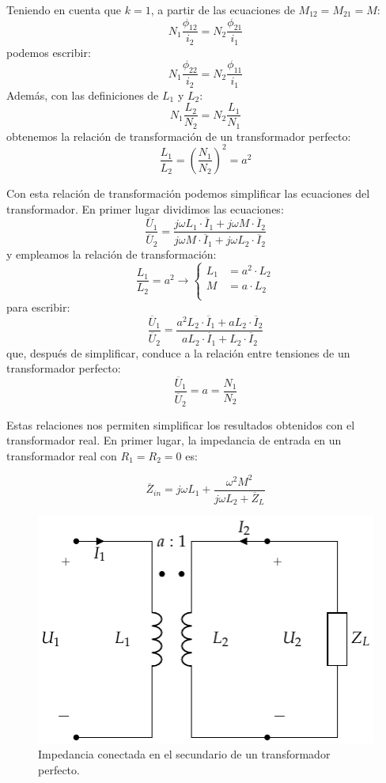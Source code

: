Teniendo en cuenta que $k = 1$, a partir de las ecuaciones de
$M_{12} = M_{21} = M$:
\[
  N_1 \frac{\phi_{12}}{i_2} = N_2 \frac{\phi_{21}}{i_1}
\]
podemos escribir:
\[
  N_1 \frac{\phi_{22}}{i_2} = N_2 \frac{\phi_{11}}{i_1}
\]
Además, con las definiciones de $L_1$ y $L_2$:
\[
  N_1 \frac{L_2}{N_2} = N_2 \frac{L_1}{N_1}
\]
obtenemos la relación de transformación de un transformador perfecto:
\begin{equation}
  \label{eq:trafo-perfecto-a}
  \boxed{\frac{L_1}{L_2} = \left(\frac{N_1}{N_2}\right)^2 = a^2}
\end{equation}


Con esta relación de transformación podemos simplificar las ecuaciones
del transformador. En primer lugar dividimos las ecuaciones:
\[
  \frac{\overline{U}_1}{\overline{U}_2} = \frac{j \omega L_1 \cdot
    \overline{I}_1 + j \omega M \cdot \overline{I}_2}{j \omega M \cdot
    \overline{I}_1 + j \omega L_2 \cdot \overline{I}_2}
\]
y empleamos la relación de transformación:
\[
  \frac{L_1}{L_2} = a^2 \rightarrow \left\{
    \begin{array}{ll}
      L_1 &= a^2 \cdot L_2\\
      M &= a \cdot L_2\\
    \end{array}\right.
\]
para escribir:
\[
  \frac{\overline{U}_1}{\overline{U}_2} = \frac{a^2 L_2 \cdot
    \overline{I}_1 + a L_2 \cdot \overline{I}_2}{a L_2 \cdot
    \overline{I}_1 + L_2 \cdot \overline{I}_2}
\]
que, después de simplificar, conduce a la relación entre tensiones de
un transformador perfecto:
\begin{equation}
  \label{eq:trafo-perfecto-tensiones}
  \boxed{\frac{\overline{U}_1}{\overline{U}_2} = a = \frac{N_1}{N_2}}
\end{equation}

Estas relaciones nos permiten simplificar los resultados obtenidos con
el transformador real. En primer lugar, la impedancia de entrada en un
transformador real con $R_1 = R_2 = 0$ es:

\[
  \overline{Z}_{in} = j\omega L_1 + \frac{\omega^2 M^2}{j\omega L_2 +
    \overline{Z}_L}
\]

\begin{figure}
  \centering
  \includegraphics[height=0.2\textheight]{../figs/TrafoPerfecto_ImpedanciaSecundario.pdf}
  \caption{Impedancia conectada en el secundario de un transformador perfecto.}
  \label{fig:trafo-perfecto-impedancia-secundario}
\end{figure}


